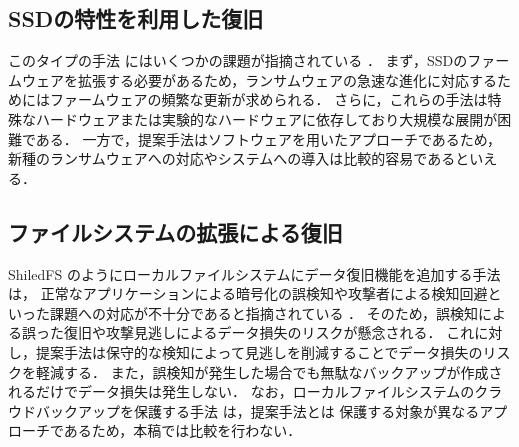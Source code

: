 \subsection{SSDの特性を利用した復旧}
このタイプの手法 \cite{huang2017flashguard,baek2018ssd} にはいくつかの課題が指摘されている \cite{wang2024ransom}．
まず，SSDのファームウェアを拡張する必要があるため，ランサムウェアの急速な進化に対応するためにはファームウェアの頻繁な更新が求められる．
さらに，これらの手法は特殊なハードウェアまたは実験的なハードウェアに依存しており大規模な展開が困難である．
一方で，提案手法はソフトウェアを用いたアプローチであるため，新種のランサムウェアへの対応やシステムへの導入は比較的容易であるといえる．

\subsection{ファイルシステムの拡張による復旧}
ShiledFS \cite{shieldFS} のようにローカルファイルシステムにデータ復旧機能を追加する手法は，
正常なアプリケーションによる暗号化の誤検知や攻撃者による検知回避といった課題への対応が不十分であると指摘されている \cite{han2020effectiveness,css2024-enomoto}．
そのため，誤検知による誤った復旧や攻撃見逃しによるデータ損失のリスクが懸念される．
これに対し，提案手法は保守的な検知によって見逃しを削減することでデータ損失のリスクを軽減する．
また，誤検知が発生した場合でも無駄なバックアップが作成されるだけでデータ損失は発生しない．
なお，ローカルファイルシステムのクラウドバックアップを保護する手法 \cite{matos2018rockfs} は，提案手法とは
保護する対象が異なるアプローチであるため，本稿では比較を行わない．
